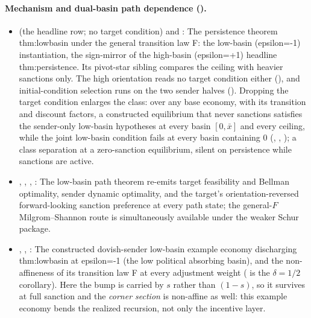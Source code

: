 \paragraph{Mechanism and dual-basin path dependence ().}
\begin{itemize}[leftmargin=1.4em,itemsep=1pt]
\item {} (the headline row; no target condition) and : The persistence theorem thm:lowbasin under the general transition law F: the low-basin (epsilon=-1) instantiation, the sign-mirror of the high-basin (epsilon=+1) headline thm:persistence. Its pivot-star sibling  compares the ceiling with heavier sanctions only. The high orientation reads no target condition either (), and initial-condition selection runs on the two sender halves (). Dropping the target condition enlarges the class: over any base economy, with its transition and discount factors, a constructed equilibrium that never sanctions satisfies the sender-only low-basin hypotheses at every basin $[0,\bar x]$ and every ceiling, while the joint low-basin condition fails at every basin containing $0$ (, , ); a class separation at a zero-sanction equilibrium, silent on persistence while sanctions are active.
\item {}, , , : The low-basin path theorem re-emits target feasibility and Bellman optimality, sender dynamic optimality, and the target's orientation-reversed forward-looking sanction preference at every path state; the general-\(F\) Milgrom--Shannon route is simultaneously available under the weaker Schur package.
\item {}, , : The constructed dovish-sender low-basin example economy discharging thm:lowbasin at epsilon=-1 (the low political absorbing basin), and the non-affineness of its transition law F at every adjustment weight ( is the \(\delta=1/2\) corollary). Here the bump is carried by \(s\) rather than \((1-s)\), so it survives at full sanction and the \emph{corner section} is non-affine as well: this example economy bends the realized recursion, not only the incentive layer.

\end{itemize}
